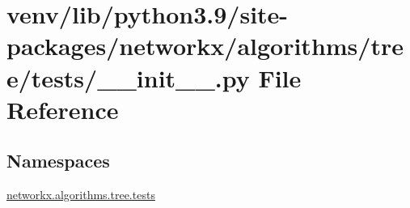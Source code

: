 \hypertarget{venv_2lib_2python3_89_2site-packages_2networkx_2algorithms_2tree_2tests_2____init_____8py}{}\section{venv/lib/python3.9/site-\/packages/networkx/algorithms/tree/tests/\+\_\+\+\_\+init\+\_\+\+\_\+.py File Reference}
\label{venv_2lib_2python3_89_2site-packages_2networkx_2algorithms_2tree_2tests_2____init_____8py}
\subsection*{Namespaces}
\begin{DoxyCompactItemize}
\item 
 \hyperlink{namespacenetworkx_1_1algorithms_1_1tree_1_1tests}{networkx.\+algorithms.\+tree.\+tests}
\end{DoxyCompactItemize}
